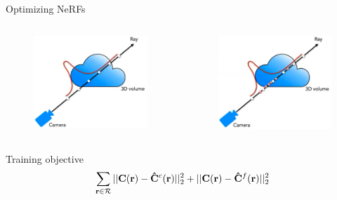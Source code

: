 \documentclass[aspectratio=1610]{beamer}
\begin{document}
\begin{frame}{Optimizing NeRFs}
    \begin{columns}
        \begin{column}{.5\textwidth}
            \begin{figure}
                \includegraphics[width=.7\textwidth]{coarse.png}
            \end{figure}
        \end{column}
        \begin{column}{.5\textwidth}
            \begin{figure}
                \includegraphics[width=.7\textwidth]{coarse-fine.png}
            \end{figure}
        \end{column}
    \end{columns}
    \bigskip
    \begin{block}{Training objective}
        \begin{equation}
            \sum_{\vb{r} \in \mathcal{R}} ||\vb{C}(\vb{r}) - \vb{\hat{C}}^c(\vb{r})||_2^2 + ||\vb{C}(\vb{r}) - \vb{\hat{C}}^f(\vb{r})||_2^2
        \end{equation}
    \end{block}
\end{frame}
\end{document}
